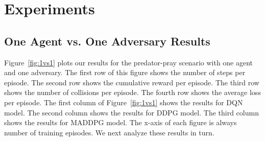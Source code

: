 
\section{Experiments}
\label{sec:experiment}


\subsection{One Agent vs. One Adversary Results}
\label{sec:experiment:1vs1}

Figure~\ref{fig:1vs1} plots our results for the predator-pray scenario with one
agent and one adversary. The first row of this figure shows the number of steps
per episode. The second row shows the cumulative reward per episode. The third
row shows the number of collisions per episode. The fourth row shows the
average loss per episode. The first column of Figure~\ref{fig:1vs1} shows the
results for DQN model. The second column shows the results for DDPG model. The
third column shows the results for MADDPG model. The x-axis of each figure is
always number of training episodes. We next analyze these results in turn.


